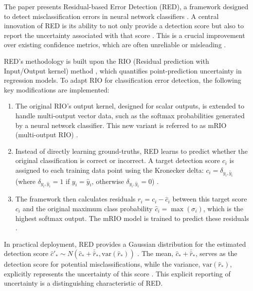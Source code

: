 \documentclass{article}
\begin{document}
The paper presents Residual-based Error Detection (RED), a framework designed to detect misclassification errors in neural network classifiers \cite{QiuMiikkulainen2022}. A central innovation of RED is its ability to not only provide a detection score but also to report the uncertainty associated with that score \cite{QiuMiikkulainen2022, Mandelbaum2017}. This is a crucial improvement over existing confidence metrics, which are often unreliable or misleading \cite{Provost1998}.

RED's methodology is built upon the RIO (Residual prediction with Input/Output kernel) method \cite{Qiu2020}, which quantifies point-prediction uncertainty in regression models. To adapt RIO for classification error detection, the following key modifications are implemented:
\begin{enumerate}
    \item The original RIO's output kernel, designed for scalar outputs, is extended to handle multi-output vector data, such as the softmax probabilities generated by a neural network classifier. This new variant is referred to as mRIO (multi-output RIO) \cite{QiuMiikkulainen2022}.
    \item Instead of directly learning ground-truths, RED learns to predict whether the original classification is correct or incorrect. A target detection score $c_i$ is assigned to each training data point using the Kronecker delta: $c_i = \delta_{y_i,\hat{y}_i}$ (where $\delta_{y_i,\hat{y}_i} = 1$ if $y_i = \hat{y}_i$, otherwise $\delta_{y_i,\hat{y}_i} = 0$) \cite{QiuMiikkulainen2022}.
    \item The framework then calculates residuals $r_i = c_i - \hat{c}_i$ between this target score $c_i$ and the original maximum class probability $\hat{c}_i = \max(\sigma_i)$, which is the highest softmax output. The mRIO model is trained to predict these residuals \cite{QiuMiikkulainen2022}.
\end{enumerate}
In practical deployment, RED provides a Gaussian distribution for the estimated detection score $\hat{c}'_* \sim N(\hat{c}_* + \bar{\hat{r}}_*, \text{var}(\hat{r}_*))$ \cite{QiuMiikkulainen2022}. The mean, $\hat{c}_* + \bar{\hat{r}}_*$, serves as the detection score for potential misclassifications, while the variance, $\text{var}(\hat{r}_*)$, explicitly represents the uncertainty of this score \cite{QiuMiikkulainen2022}. This explicit reporting of uncertainty is a distinguishing characteristic of RED.
\end{document}
